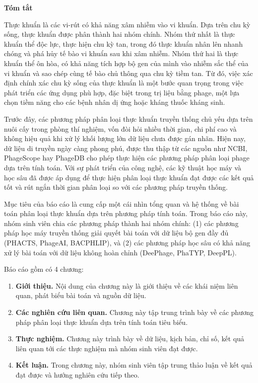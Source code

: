 \begin{center}
\textbf{\large{Tóm tắt}	}
\end{center}


\begin{small}
Thực khuẩn là các vi-rút có khả năng xâm nhiễm vào vi khuẩn. Dựa trên chu kỳ sống, thực khuẩn được phân thành hai nhóm chính. Nhóm thứ nhất là thực khuẩn thể độc lực, thực hiện chu kỳ tan, trong đó thực khuẩn nhân lên nhanh chóng và phá hủy tế bào vi khuẩn sau khi xâm nhiễm. Nhóm thứ hai là thực khuẩn thể ôn hòa, có khả năng tích hợp bộ gen của mình vào nhiễm sắc thể của vi khuẩn và sao chép cùng tế bào chủ thông qua chu kỳ tiềm tan. Từ đó, việc xác định chính xác chu kỳ sống của thực khuẩn là một bước quan trọng trong việc phát triển các ứng dụng phù hợp, đặc biệt trong trị liệu bằng phage, một lựa chọn tiềm năng cho các bệnh nhân dị ứng hoặc kháng thuốc kháng sinh.

Trước đây, các phương pháp phân loại thực khuẩn truyền thống chủ yếu dựa trên nuôi cấy trong phòng thí nghiệm, vốn đòi hỏi nhiều thời gian, chi phí cao và không hiệu quả khi xử lý khối lượng lớn dữ liệu chưa được gán nhãn. Hiện nay, dữ liệu di truyền ngày càng phong phú, được thu thập từ các nguồn như NCBI, PhageScope hay PhageDB cho phép thực hiện các phương pháp phân loại phage dựa trên tính toán. Với sự phát triển của công nghệ, các kỹ thuật học máy và học sâu đã được áp dụng để thực hiện phân loại thực khuẩn đạt được các kết quả tốt và rút ngắn thời gian phân loại so với các phương pháp truyền thống.

Mục tiêu của báo cáo là cung cấp một cái nhìn tổng quan và hệ thống về bài toán phân loại thực khuẩn dựa trên phương pháp tính toán. Trong báo cáo này, nhóm sinh viên chia các phương pháp thành hai nhóm chính: (1) các phương pháp học máy truyền thống giải quyết bài toán với dữ liệu bộ gen đầy đủ (PHACTS, PhageAI, BACPHLIP), và (2) các phương pháp học sâu có khả năng xử lý bài toán với dữ liệu không hoàn chỉnh (DeePhage, PhaTYP, DeepPL).

Báo cáo gồm có 4 chương:
\begin{enumerate}
    \item \textbf{Giới thiệu.} Nội dung của chương này là giới thiệu về các khái niệm liên quan, phát biểu bài toán và nguồn dữ liệu.
    \item \textbf{Các nghiên cứu liên quan.} Chương này tập trung trình bày về các phương pháp phân loại thực khuẩn dựa trên tính toán tiêu biểu.
    \item \textbf{Thực nghiệm.} Chương này trình bày về dữ liệu, kịch bản, chỉ số, kết quả liên quan tới các thực nghiệm mà nhóm sinh viên đạt được.
    \item \textbf{Kết luận.} Trong chương này, nhóm sinh viên tập trung thảo luận về kết quả đạt được và hướng nghiên cứu tiếp theo.
\end{enumerate}

\end{small}